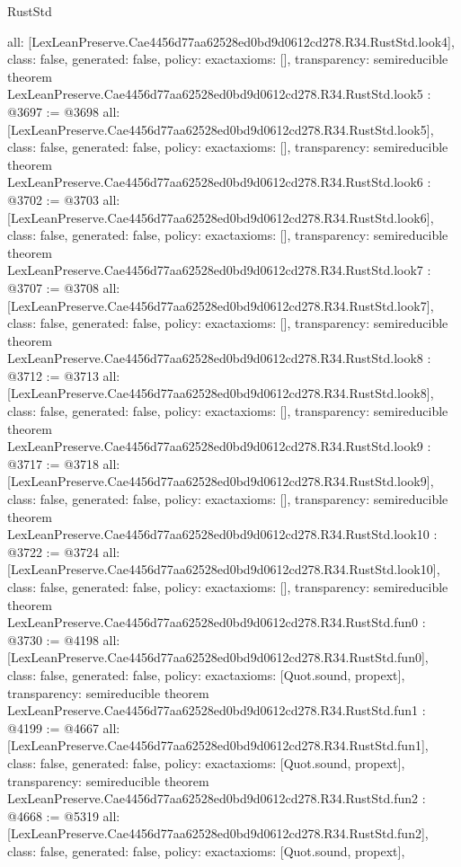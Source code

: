 \begin{lexlean}{RustStd}
\begin{coremodule}
{  all: [LexLeanPreserve.Cae4456d77aa62528ed0bd9d0612cd278.R34.RustStd.look4],
  class: false,
  generated: false,
  policy: exact{axioms: []},
  transparency: semireducible
}
theorem LexLeanPreserve.Cae4456d77aa62528ed0bd9d0612cd278.R34.RustStd.look5 : @3697 := @3698 {
  all: [LexLeanPreserve.Cae4456d77aa62528ed0bd9d0612cd278.R34.RustStd.look5],
  class: false,
  generated: false,
  policy: exact{axioms: []},
  transparency: semireducible
}
theorem LexLeanPreserve.Cae4456d77aa62528ed0bd9d0612cd278.R34.RustStd.look6 : @3702 := @3703 {
  all: [LexLeanPreserve.Cae4456d77aa62528ed0bd9d0612cd278.R34.RustStd.look6],
  class: false,
  generated: false,
  policy: exact{axioms: []},
  transparency: semireducible
}
theorem LexLeanPreserve.Cae4456d77aa62528ed0bd9d0612cd278.R34.RustStd.look7 : @3707 := @3708 {
  all: [LexLeanPreserve.Cae4456d77aa62528ed0bd9d0612cd278.R34.RustStd.look7],
  class: false,
  generated: false,
  policy: exact{axioms: []},
  transparency: semireducible
}
theorem LexLeanPreserve.Cae4456d77aa62528ed0bd9d0612cd278.R34.RustStd.look8 : @3712 := @3713 {
  all: [LexLeanPreserve.Cae4456d77aa62528ed0bd9d0612cd278.R34.RustStd.look8],
  class: false,
  generated: false,
  policy: exact{axioms: []},
  transparency: semireducible
}
theorem LexLeanPreserve.Cae4456d77aa62528ed0bd9d0612cd278.R34.RustStd.look9 : @3717 := @3718 {
  all: [LexLeanPreserve.Cae4456d77aa62528ed0bd9d0612cd278.R34.RustStd.look9],
  class: false,
  generated: false,
  policy: exact{axioms: []},
  transparency: semireducible
}
theorem LexLeanPreserve.Cae4456d77aa62528ed0bd9d0612cd278.R34.RustStd.look10 : @3722 := @3724 {
  all: [LexLeanPreserve.Cae4456d77aa62528ed0bd9d0612cd278.R34.RustStd.look10],
  class: false,
  generated: false,
  policy: exact{axioms: []},
  transparency: semireducible
}
theorem LexLeanPreserve.Cae4456d77aa62528ed0bd9d0612cd278.R34.RustStd.fun0 : @3730 := @4198 {
  all: [LexLeanPreserve.Cae4456d77aa62528ed0bd9d0612cd278.R34.RustStd.fun0],
  class: false,
  generated: false,
  policy: exact{axioms: [Quot.sound, propext]},
  transparency: semireducible
}
theorem LexLeanPreserve.Cae4456d77aa62528ed0bd9d0612cd278.R34.RustStd.fun1 : @4199 := @4667 {
  all: [LexLeanPreserve.Cae4456d77aa62528ed0bd9d0612cd278.R34.RustStd.fun1],
  class: false,
  generated: false,
  policy: exact{axioms: [Quot.sound, propext]},
  transparency: semireducible
}
theorem LexLeanPreserve.Cae4456d77aa62528ed0bd9d0612cd278.R34.RustStd.fun2 : @4668 := @5319 {
  all: [LexLeanPreserve.Cae4456d77aa62528ed0bd9d0612cd278.R34.RustStd.fun2],
  class: false,
  generated: false,
  policy: exact{axioms: [Quot.sound, propext]},
}
\end{coremodule}
\end{lexlean}
